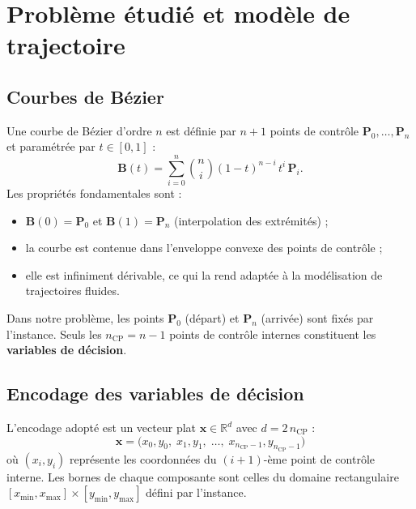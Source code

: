 \section{Problème étudié et modèle de trajectoire}
\label{sec:problem}

\subsection{Courbes de Bézier}

Une courbe de Bézier d'ordre $n$ est définie par $n+1$ points de contrôle
$\mathbf{P}_0, \ldots, \mathbf{P}_n$ et paramétrée par $t \in [0,1]$ :
\begin{equation}
\label{eq:bezier}
  \mathbf{B}(t) = \sum_{i=0}^{n} \binom{n}{i} (1-t)^{n-i}\, t^i \, \mathbf{P}_i.
\end{equation}
Les propriétés fondamentales sont :
\begin{itemize}[nosep]
  \item $\mathbf{B}(0) = \mathbf{P}_0$ et $\mathbf{B}(1) = \mathbf{P}_n$
        (interpolation des extrémités) ;
  \item la courbe est contenue dans l'enveloppe convexe des points de contrôle ;
  \item elle est infiniment dérivable, ce qui la rend adaptée à la modélisation
        de trajectoires fluides.
\end{itemize}

Dans notre problème, les points $\mathbf{P}_0$ (départ) et $\mathbf{P}_n$
(arrivée) sont fixés par l'instance.  Seuls les $n_{\text{CP}} = n - 1$ points
de contrôle internes constituent les \textbf{variables de décision}.

\subsection{Encodage des variables de décision}

L'encodage adopté est un vecteur plat $\mathbf{x} \in \mathbb{R}^d$ avec
$d = 2 \, n_{\text{CP}}$ :
\[
  \mathbf{x} = \bigl(x_0, y_0, \; x_1, y_1, \; \ldots, \; x_{n_{\text{CP}}-1},
                y_{n_{\text{CP}}-1}\bigr)
\]
où $(x_i, y_i)$ représente les coordonnées du $(i+1)$-ème point de contrôle
interne.  Les bornes de chaque composante sont celles du domaine rectangulaire
$[x_{\min}, x_{\max}] \times [y_{\min}, y_{\max}]$ défini par l'instance.

